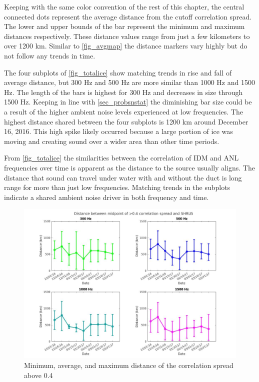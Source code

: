Keeping with the same color convention of the rest of this chapter, the central connected dots represent the average distance from the cutoff correlation spread. The lower and upper bounds of the bar represent the minimum and maximum distances respectively. These distance values range from just a few kilometers to over 1200 km. Similar to \autoref{fig_avgmap} the distance markers vary highly but do not follow any trends in time. 

The four subplots of \autoref{fig_totalice} show matching trends in rise and fall of average distance, but 300 Hz and 500 Hz are more similar than 1000 Hz and 1500 Hz. The length of the bars is highest for 300 Hz and decreases in size through 1500 Hz. Keeping in line with \autoref{sec_probsnstat} the diminishing bar size could be a result of the higher ambient noise levels experienced at low frequencies. The highest distance shared between the four subplots is 1200 km around December 16, 2016. This high spike likely occurred because a large portion of ice was moving and creating sound over a wider area than other time periods.

From \autoref{fig_totalice} the similarities between the correlation of IDM and ANL frequencies over time is apparent as the distance to the source usually aligns. The distance that sound can travel under water with and without the duct is long range for more than just low frequencies. Matching trends in the subplots indicate a shared ambient noise driver in both frequency and time. 

\begin{figure}[p]
\centering
\includegraphics[scale=0.38]{Figures/errorbars_tiled_noisland.jpg}
\caption{Minimum, average, and maximum distance of the correlation spread above 0.4}
\label{fig_totalice}
\end{figure}

